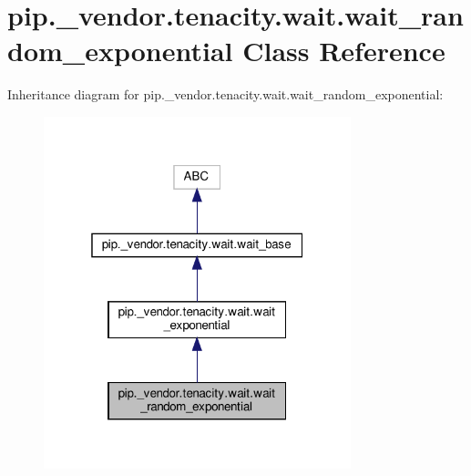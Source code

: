 \hypertarget{classpip_1_1__vendor_1_1tenacity_1_1wait_1_1wait__random__exponential}{}\section{pip.\+\_\+vendor.\+tenacity.\+wait.\+wait\+\_\+random\+\_\+exponential Class Reference}
\label{classpip_1_1__vendor_1_1tenacity_1_1wait_1_1wait__random__exponential}


Inheritance diagram for pip.\+\_\+vendor.\+tenacity.\+wait.\+wait\+\_\+random\+\_\+exponential\+:
\nopagebreak
\begin{figure}[H]
\begin{center}
\leavevmode
\includegraphics[width=253pt]{classpip_1_1__vendor_1_1tenacity_1_1wait_1_1wait__random__exponential__inherit__graph}
\end{center}
\end{figure}


